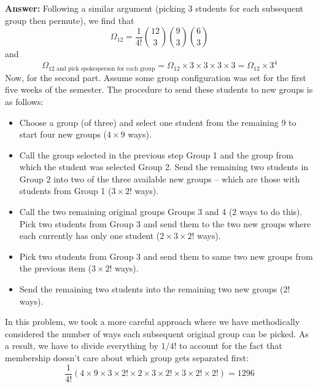 \documentclass[11pt]{article}
\newcommand{\f}[2]{\frac{#1}{#2}}
\begin{document}
\begin{enumerate}[(a)]
	\textbf{Answer:} Following a similar argument (picking 3 students for each subsequent group then permute), we find that
	\begin{equation*}
	\boxed{\Omega_{12} = \f{1}{4!}\binom{12}{3}\binom{9}{3}\binom{6}{3}}
	\end{equation*}
	and 
	\begin{equation*}
	\boxed{\Omega_\text{12 and pick spokesperson for each group} = \Omega_{12} \times 3\times 3 \times 3 \times 3 = \Omega_{12}\times 3^4}
	\end{equation*} 
	Now, for the second part. Assume some group configuration was set for the first five weeks of the semester. The procedure to send these students to new groups is as follows:
	\begin{itemize}
		\item Choose a group (of three) and select one student from the remaining 9 to start four new groups ($4\times9$ ways). 
		\item Call the group selected in the previous step Group 1 and the group from which the student was selected Group 2. Send the remaining two students in Group 2 into two of the three available new groups --  which are those with students from Group 1 ($3\times 2!$ ways). 
		\item Call the two remaining original groups Groups 3 and 4 ($2$ ways to do this). Pick two students from Group 3 and send them to the two new groups where each currently has only one student ($2\times 3\times 2!$ ways).		
		\item Pick two students from Group 3 and send them to same two new groups from the previous item ($3\times 2!$ ways).
		\item Send the remaining two students into the remaining two new groups ($2!$ ways).
	\end{itemize}
	In this problem, we took a more careful approach where we have methodically considered the number of ways each subsequent original group can be picked. As a result, we have to divide everything by $1/4!$ to account for the fact that membership doesn't care about which group gets separated first: 
	\begin{equation*}
	\f{1}{4!}\left( 4\times 9\times 3\times 2! \times 2\times  3\times 2! \times 3\times 2!\times 2! \right) = \boxed{1296}
	\end{equation*}
\end{enumerate} 
\end{document}
